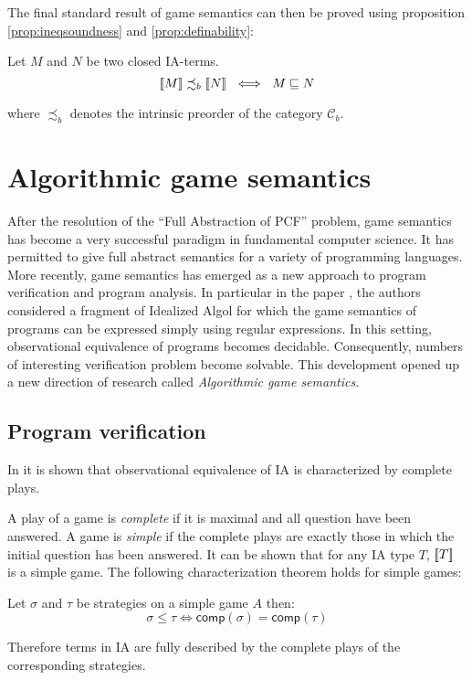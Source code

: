 The final standard result of game semantics can then be proved using proposition \ref{prop:ineqsoundness} and \ref{prop:definability}:
\begin{thm}
Let $M$ and $N$ be two closed IA-terms.
$${[\![ M ]\!]} \precsim_b {[\![ N ]\!]} \ \iff \ M \sqsubseteq N$$
\end{thm}

where $\precsim_b$ denotes the intrinsic preorder of the category $\mathcal{C}_b$.


\section{Algorithmic game semantics}

After the resolution of the ``Full Abstraction of PCF'' problem,
game semantics has become a very successful paradigm in fundamental
computer science. It has permitted to give full abstract semantics
for a variety of programming languages. More recently, game
semantics has emerged as a new approach to program verification and
program analysis. In particular in the paper \cite{ghicamccusker00},
the authors considered a fragment of Idealized Algol for which the
game semantics of programs can be expressed simply using regular
expressions. In this setting, observational equivalence of programs
becomes decidable. Consequently, numbers of interesting verification
problem become solvable. This development opened up a new direction
of research called \emph{Algorithmic game semantics}.

\subsection{Program verification}


In \citep{AM97a} it is shown that observational equivalence of IA is
characterized by complete plays.

A play of a game is \emph{complete} if it is maximal and all
question have been answered. A game is \emph{simple} if the complete
plays are exactly those in which the initial question has been
answered. It can be shown that for any IA type $T$, ${[\![ T ]\!]}$ is a
simple game. The following characterization theorem holds for simple
games:
\begin{thm}
Let $\sigma$ and $\tau$ be strategies on a simple game $A$ then:
$$\sigma \leq \tau \iff \textsf{comp}(\sigma) = \textsf{comp}(\tau)$$
\end{thm}
Therefore terms in IA are fully described by the complete plays of
the corresponding strategies.

